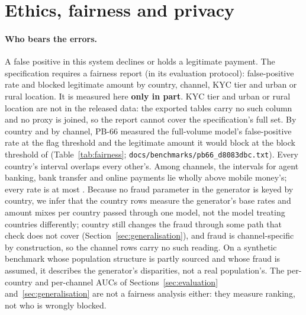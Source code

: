 \section{Ethics, fairness and privacy}
\label{sec:ethics}

\paragraph{Who bears the errors.} A false positive in this system declines or holds a legitimate
payment. The specification requires a fairness report (in its evaluation protocol): false-positive
rate and blocked legitimate amount by country, channel, KYC tier and urban or rural location. It is
measured here \textbf{only in part}. KYC tier and urban or rural location are not in the released
data: the exported tables carry no such column and no proxy is joined, so the report cannot cover
the specification's full set. By country and by channel, PB-66 measured the full-volume model's
false-positive rate at the flag threshold and the legitimate amount it would block at the block
threshold of \nBlockThreshold{} (Table~\ref{tab:fairness}; \texttt{docs/benchmarks/pb66\_d8083dbc.txt}). Every country's interval
overlaps every other's. Among channels, the intervals for agent banking, bank transfer and online
payments lie wholly above mobile money's; every rate is at most \nFairBankFPR{}. Because no fraud
parameter in the generator is keyed by country, we infer that the country rows measure the
generator's base rates and amount mixes per country passed through one model, not the model treating
countries differently; country still changes the fraud through some path that check does not cover
(Section~\ref{sec:generalisation}), and fraud is channel-specific by construction, so the channel rows
carry no such reading. On a
synthetic benchmark whose population structure is partly sourced and whose fraud is assumed, it
describes the generator's disparities, not a real population's. The per-country and per-channel AUCs
of Sections~\ref{sec:evaluation} and~\ref{sec:generalisation} are not a fairness analysis either: they
measure ranking, not who is wrongly blocked.

